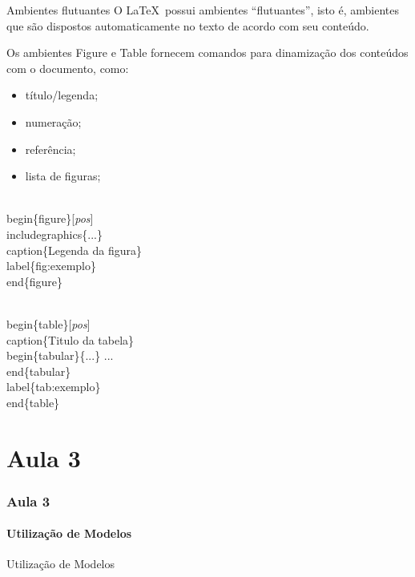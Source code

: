 \documentclass{beamer}
\begin{document}
\begin{frame}{Ambientes flutuantes}
    O \LaTeX\ possui ambientes ``flutuantes'', isto é, ambientes que são dispostos automaticamente no texto de acordo com seu conteúdo.
    
    Os ambientes Figure e Table fornecem comandos para dinamização dos conteúdos com o documento, como:
    
    \begin{itemize}
    \item título/legenda;
    \item numeração;
    \item referência;
    \item lista de figuras;
    \end{itemize}
    
    \begin{example}
        \begin{semiverbatim}
\\begin\{figure\}[\textit{pos}]
  \\includegraphics\{...\}
  \\caption\{Legenda da figura\}
  \\label\{fig:exemplo\}
\\end\{figure\}

\\begin\{table\}[\textit{pos}]
  \\caption\{Titulo da tabela\}
  \\begin\{tabular\}\{...\}
  ...
  \\end\{tabular\}
  \\label\{tab:exemplo\}
\\end\{table\}
\end{semiverbatim}
    \end{example}
\end{frame}


\part{Aula 3}
\section{Aula 3}

\subsection{Utilização de Modelos}
\begin{frame}{Utilização de Modelos}
\end{frame}
\end{document}

